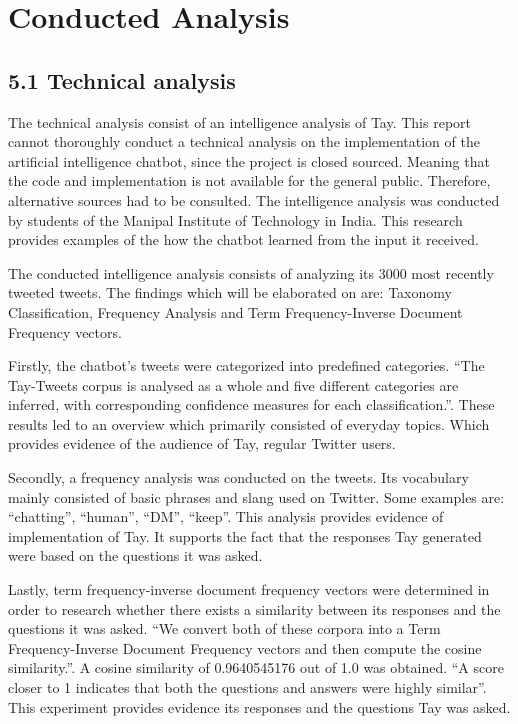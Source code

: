 \chapter{Conducted Analysis}

\section*{\textbf{5.1 Technical analysis}}
The technical analysis consist of an intelligence analysis of Tay. This report cannot thoroughly conduct a technical analysis on the implementation of the artificial intelligence chatbot, since the project is closed sourced. Meaning that the code and implementation is not available for the general public. Therefore, alternative sources had to be consulted. The intelligence analysis was conducted by students of the Manipal Institute of Technology in India. This research provides examples of the how the chatbot learned from the input it received.

The conducted intelligence analysis consists of analyzing its 3000 most recently tweeted tweets. The findings which will be elaborated on are: Taxonomy Classification, Frequency Analysis and Term Frequency-Inverse Document Frequency vectors.

Firstly, the chatbot's tweets were categorized into predefined categories. “The Tay-Tweets corpus is analysed as a whole and five different categories are inferred, with corresponding confidence measures for each classification.”\cite{IntelligenceAnalysis}. These results led to an overview which primarily consisted of everyday topics. Which provides evidence of the audience of Tay, regular Twitter users.

Secondly, a frequency analysis was conducted on the tweets. Its vocabulary mainly consisted of basic phrases and slang used on Twitter. Some examples are: “chatting”, “human”, “DM”, “keep”\cite{IntelligenceAnalysis}. This analysis provides evidence of implementation of Tay. It supports the fact that the responses Tay generated were based on the questions it was asked.

Lastly, term frequency-inverse document frequency vectors were determined in order to research whether there exists a similarity between its responses and the questions it was asked. “We convert both of these corpora into a Term Frequency-Inverse Document Frequency vectors and then compute the cosine similarity.”\cite{IntelligenceAnalysis}. A cosine similarity of 0.9640545176 out of 1.0 was obtained. “A score closer to 1 indicates that both the questions and answers were highly similar”\cite{IntelligenceAnalysis}. This experiment provides evidence its responses and the questions Tay was asked.


